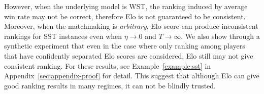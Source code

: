 
However, when the underlying model is WST, the ranking induced by average win rate may not be correct, therefore Elo is not guaranteed to be consistent. Moreover, when the matchmaking is \emph{arbitrary}, Elo score can produce inconsistent rankings for SST instances even when $\eta\to 0$ and $T\to \infty$. We also show through a synthetic experiment that even in the case where only ranking among players that have confidently separated Elo scores are considered, Elo still may not give consistent ranking. For these results, see Example~\ref{example:sst} in Appendix~\ref{sec:appendix-proof} for detail. This suggest that although Elo can give good ranking results in many regimes, it can not be blindly trusted.











